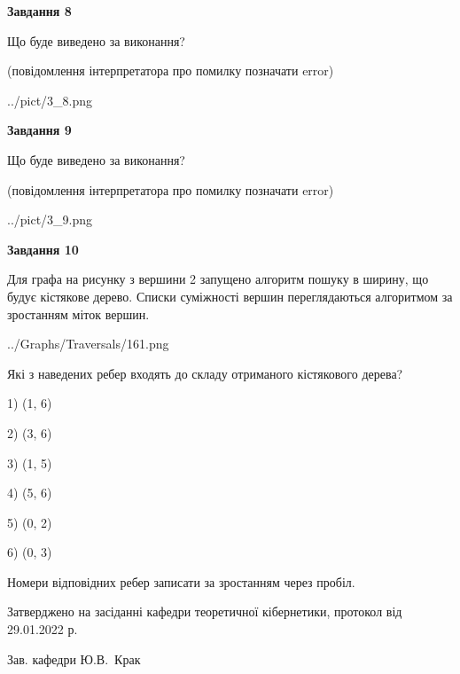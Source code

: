 \documentclass[12pt, ukrainian]{article}
\begin{document}
{\begin {large}
{\begin {center}\textbf{Завдання 8}\end {center}}\par
Що буде виведено за виконання?\par
 (повідомлення інтерпретатора про помилку позначати error)\par
\begin{center}
	{../pict/3_8.png}
\end{center}
\newpage

{\begin {center}\textbf{Завдання 9}\end {center}}\par
Що буде виведено за виконання?\par
 (повідомлення інтерпретатора про помилку позначати error)\par
\begin{center}
	{../pict/3_9.png}
\end{center}
\newpage

{\begin {center}\textbf{Завдання 10}\end {center}}\par
Для графа на рисунку з вершини 2 запущено алгоритм пошуку в ширину, що будує кістякове дерево. Списки суміжності вершин переглядаються алгоритмом за зростанням міток вершин.\par
\begin{center}
	{../Graphs/Traversals/161.png}
\end{center}
\par Які з наведених ребер входять до складу отриманого кістякового дерева?\par
1) (1, 6)\par
2) (3, 6)\par
3) (1, 5)\par
4) (5, 6)\par
5) (0, 2)\par
6) (0, 3)\par
{\vskip 15pt} Номери відповідних ребер записати за зростанням через пробіл.\par
\newpage


\end {large}
}
{\smallskip \begin {small} Затверджено на засіданні кафедри теоретичної кібернетики, протокол  від   29.01.2022 р.\par\smallskip\smallskip
{\parbox {6.5 cm}{Зав. кафедри \dotfill Ю.В.~Крак}} \end{small}}
\end{document}
